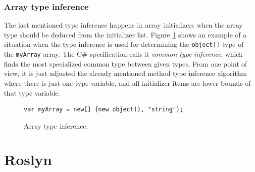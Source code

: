 \subsubsection*{Array type inference}
The last mentioned type inference happens in array initializers when the array type should be deduced from the initializer list. 
Figure \ref{img14:arrayTypeInf} shows an example of a situation when the type inference is used for determining the \texttt{object[]} type of the \texttt{myArray} array. 
The C\# specification calls it \textit{common type inference}, which finds the most specialized common type between given types. 
From one point of view, it is just adjusted the already mentioned method type inference algorithm where there is just one type variable, and all initializer items are lower bounds of that type variable.
\begin{figure}[h]
\begin{lstlisting}[style=csharp]
var myArray = new[] {new object(), "string"};
\end{lstlisting}
\caption{Array type inference.}
\label{img14:arrayTypeInf}
\end{figure}

\section{Roslyn}

